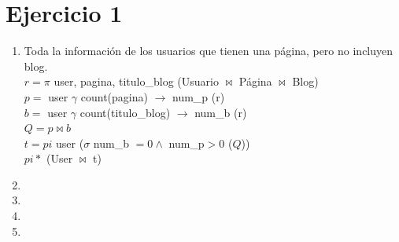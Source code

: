 \documentclass[a4paper, 12pt]{report}
\begin{document}
\section*{Ejercicio 1}{
\begin{enumerate}[label=\alph*)]
\item{Toda la información de los usuarios que tienen una página, pero no
        incluyen blog.\\
    $r = \pi$ user,  pagina, titulo\_blog (Usuario $\Join$ Página $\Join$ Blog)\\
    $p = $ user $\gamma$ count(pagina) $\rightarrow$ num\_p (r)\\
    $b = $ user $\gamma$ count(titulo\_blog) $\rightarrow$ num\_b (r)\\
    $Q = p \Join b$\\
    $t =pi$ user ($\sigma$ num\_b $= 0 \wedge$ num\_p$ > 0$ ($Q$))\\
    $pi *$ (User $\Join$ t)
    }
\item{}
\item{}
\item{}
\item{}
\end{enumerate}
}
\end{document}
